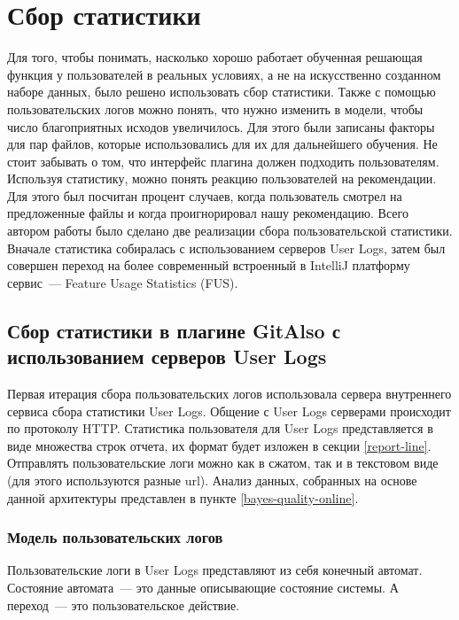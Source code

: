 \section{Сбор статистики}\label{stats-main}
Для того, чтобы понимать, насколько хорошо работает обученная решающая функция у пользователей в реальных условиях, а не на искусственно созданном наборе данных, было решено использовать сбор статистики. Также с помощью пользовательских логов можно понять, что нужно изменить в модели, чтобы число благоприятных исходов увеличилось. Для этого были записаны факторы для пар файлов, которые использовались для их для дальнейшего обучения. Не стоит забывать о том, что интерфейс плагина должен подходить пользователям. Используя статистику, можно понять реакцию пользователей на рекомендации. Для этого был посчитан процент случаев, когда пользователь смотрел на предложенные файлы и когда проигнорировал нашу рекомендацию. Всего автором работы было сделано две реализации сбора пользовательской статистики. Вначале статистика собиралась с использованием серверов User Logs, затем был совершен переход на более современный встроенный в IntelliJ платформу сервис~--- Feature Usage Statistics (FUS).
\subsection{Сбор статистики в плагине GitAlso с использованием серверов User Logs}\label{gitalso-stats}
Первая итерация сбора пользовательских логов использовала сервера внутреннего сервиса сбора статистики User Logs. Общение с User Logs серверами происходит по протоколу HTTP. Статистика пользователя для User Logs представляется в виде множества строк отчета, их формат будет изложен в секции \ref{report-line}. Отправлять пользовательские логи можно как в сжатом, так и в текстовом виде (для этого используются разные url). Анализ данных, собранных на основе данной архитектуры представлен в пункте \ref{bayes-quality-online}.
\subsubsection{Модель пользовательских логов}
Пользовательские логи в User Logs представляют из себя конечный автомат. Состояние автомата~--- это данные описывающие состояние системы. А переход~--- это пользовательское действие.
